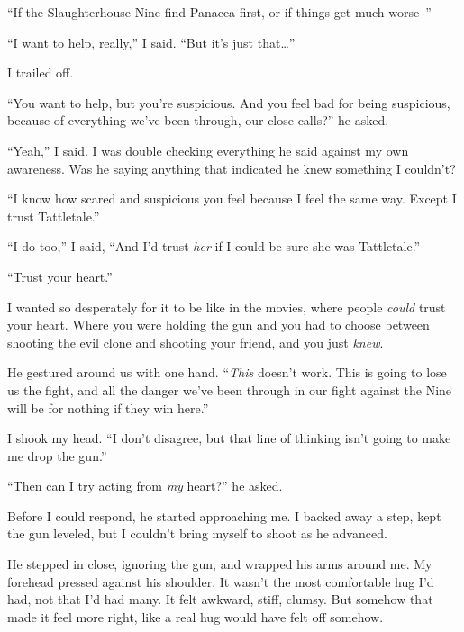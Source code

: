 ``If the Slaughterhouse Nine find Panacea first, or if things get much worse--''



``I want to help, really,'' I said.  ``But it's just that\ldots''



I trailed off.



``You want to help, but you're suspicious.  And you feel bad for being suspicious, because of everything we've been through, our close calls?'' he asked.



``Yeah,'' I said.  I was double checking everything he said against my own awareness.  Was he saying anything that indicated he knew something I couldn't?



``I know how scared and suspicious you feel because I feel the same way.  Except I\emph{ }trust Tattletale.''



``I do too,'' I said, ``And I'd trust \emph{her} if I could be sure she was Tattletale.''



``Trust your heart.''



I wanted so desperately for it to be like in the movies, where people \emph{could} trust your heart.  Where you were holding the gun and you had to choose between shooting the evil clone and shooting your friend, and you just \emph{knew}.



He gestured around us with one hand. ``\emph{This} doesn't work.  This is going to lose us the fight, and all the danger we've been through in our fight against the Nine will be for nothing if they win here.''



I shook my head.  ``I don't disagree, but that line of thinking isn't going to make me drop the gun.''



``Then can I try acting from \emph{my} heart?''  he asked.



Before I could respond, he started approaching me.  I backed away a step, kept the gun leveled, but I couldn't bring myself to shoot as he advanced.



He stepped in close, ignoring the gun, and wrapped his arms around me.  My forehead pressed against his shoulder.  It wasn't the most comfortable hug I'd had, not that I'd had many.  It felt awkward, stiff, clumsy.  But somehow that made it feel more right, like a real hug would have felt off somehow.



